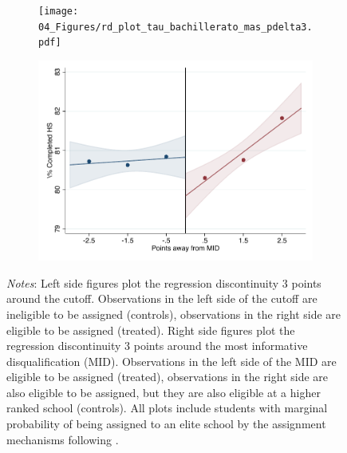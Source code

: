 \documentclass[oneside,11pt]{article}
\begin{document}
\begin{figure}[H]
\begin{center}
    \begin{subfigure}{0.475\textwidth}
        \centering
        \texttt{[image: 04\_Figures/rd\_plot\_tau\_bachillerato\_mas\_pdelta3.pdf]}
    \end{subfigure}
    \begin{subfigure}{0.475\textwidth}
        \centering
        \includegraphics[width=\textwidth]{04_Figures/rd_plot_mid_bachillerato_mas_pdelta3.pdf}
    \end{subfigure}
    \end{center}
    
\footnotesize
\textit{Notes}: Left side figures plot the regression discontinuity 3 points around the cutoff. Observations in the left side of the cutoff are ineligible to be assigned (controls), observations in the right side are eligible to be assigned (treated). Right side figures plot the regression discontinuity 3 points around the most informative disqualification (MID). Observations in the left side of the MID are eligible to be assigned (treated), observations in the right side are also eligible to be assigned, but they are also eligible at a higher ranked school (controls). All plots include students with marginal probability of being assigned to an elite school by the assignment mechanisms following \citet{abdulkadirouglu2022breaking}. 
\end{figure}
\end{document}
